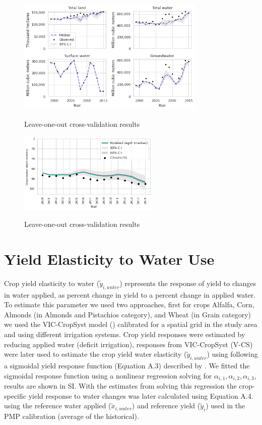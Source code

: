 \documentclass[11pt,a4paper]{article}
\begin{document}
\begin{figure}[H]
\centering
\includegraphics[width=0.8\textwidth]{water_use_by_source.png}
\label{fig:mesh1}
\caption{Leave-one-out cross-validation results}
\end{figure}

\begin{figure}[H]
\centering
\includegraphics[width=0.6\textwidth]{gw_depth.png}
\label{fig:mesh1}
\caption{Leave-one-out cross-validation results}
\end{figure}


\section{Yield Elasticity to Water Use}

Crop yield elasticity to water ($\tilde{y}_{i,water}$) represents the response of yield to changes in water applied, as percent change in yield to a percent change in applied water. To estimate this parameter we used two approaches, first for crops Alfalfa, Corn, Almonds (in Almonds and Pistachios category), and Wheat (in Grain category) we used the VIC-CropSyst model (\cite{malek_viccropsyst-v2_2017}) calibrated for a spatial grid in the study area and using different irrigation systems. Crop yield responses were estimated by reducing applied water (deficit irrigation), responses from VIC-CropSyst (V-CS) were later used to estimate the crop yield water elasticity ($\tilde{y}_{i,water}$) using following a sigmoidal yield response function (Equation A.3) described by \textcite{merel_regional_2014}. We fitted the sigmoidal response function using a nonlinear regression solving for $\alpha_{i,1},\alpha_{i,2},\alpha_{i,3}$, results are shown in SI. With the estimates from solving this regression the crop-specific yield response to water changes was later calculated using Equation A.4. using the reference water applied ($\tilde{x}_{i,water}$) and reference yield ($\tilde{y}_{i}$) used in the PMP calibration (average of the historical). 
\end{document}

